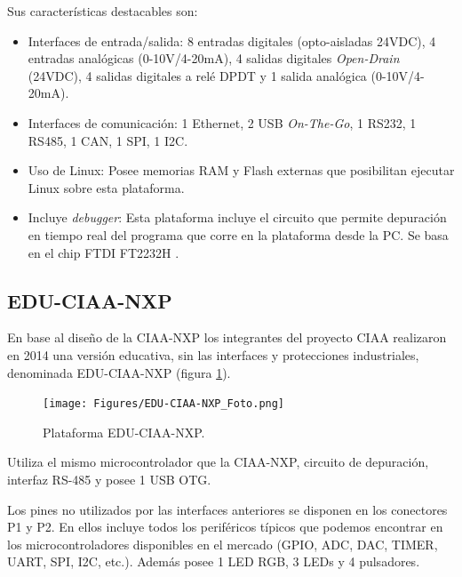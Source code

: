 Sus características destacables son:

\begin{itemize}
\item
Interfaces de entrada/salida: 8 entradas digitales (opto-aisladas 24VDC), 4 entradas analógicas (0-10V/4-20mA), 4 salidas digitales \emph{Open-Drain} (24VDC), 4 salidas digitales a relé DPDT y 1 salida analógica (0-10V/4-20mA).
\item
Interfaces de comunicación: 1 Ethernet, 2 USB \emph{On-The-Go}, 1 RS232, 1 RS485, 1 CAN, 1 SPI, 1 I2C.
\item
Uso de Linux: Posee memorias RAM y Flash externas que posibilitan ejecutar Linux sobre esta plataforma.
\item
Incluye \emph{debugger}: Esta plataforma incluye el circuito que permite depuración en tiempo real del programa que corre en la plataforma desde la PC. Se basa en el chip FTDI FT2232H \cite{FT2232H}.
\end{itemize}


\subsection{EDU-CIAA-NXP}

En base al diseño de la CIAA-NXP los integrantes del proyecto CIAA realizaron en 2014 una versión educativa, sin las interfaces y protecciones industriales, denominada EDU-CIAA-NXP (figura \ref{fig:eduCiaa}).

\begin{figure}[!htbp]
\begin{center}  %
\texttt{[image: Figures/EDU-CIAA-NXP\_Foto.png]}
\par\caption{Plataforma EDU-CIAA-NXP.}\label{fig:eduCiaa}
\end{center}
\end{figure}

Utiliza el mismo microcontrolador que la CIAA-NXP, circuito de depuración, interfaz RS-485 y posee 1 USB OTG.

Los pines no utilizados por las interfaces anteriores se disponen en los conectores P1 y P2. En ellos incluye todos los periféricos típicos que podemos encontrar en los microcontroladores disponibles en el mercado (GPIO, ADC, DAC, TIMER, UART, SPI, I2C, etc.). Además posee 1 LED RGB, 3 LEDs y 4 pulsadores.


